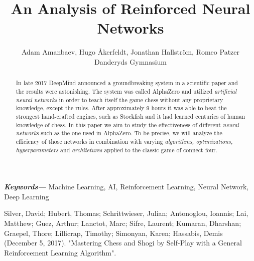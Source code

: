 \documentclass[a4paper]{article}
\title{An Analysis of Reinforced Neural Networks}
\author{Adam Amanbaev, Hugo Åkerfeldt, Jonathan Hallström, Romeo Patzer \\ 
        \small Danderyds Gymnasium \\
}
\providecommand{\keywords}[1]
{ 
    \small
    \textbf{\textit{Keywords---}} #1
}
\begin{document}
\maketitle

\begin{abstract}
    In late 2017 DeepMind announced a groundbreaking system in a scientific paper \cite{alphazero} and the results were astonishing. The system was called AlphaZero and utilized \emph{artificial neural networks} in order to teach itself the game chess without any proprietary knowledge, except the rules. After approximately 9 hours it was able to beat the strongest hand-crafted engines, such as Stockfish and it had learned centuries of human knowledge of chess. In this paper we aim to study the effectiveness of different \emph{neural networks} such as the one used in AlphaZero. To be precise, we will analyze the efficiency of those networks in combination with varying \emph{algorithms, optimizations, hyperparameters} and \emph {architetures} applied to the classic game of connect four. 
\end{abstract} \hspace{10pt}

\keywords{Machine Learning, AI, Reinforcement Learning, Neural Network, Deep Learning}

\begin{thebibliography}{100}
Silver, David; Hubert, Thomas; Schrittwieser, Julian; Antonoglou, Ioannis; Lai, Matthew; Guez, Arthur; Lanctot, Marc; Sifre, Laurent; Kumaran, Dharshan; Graepel, Thore; Lillicrap, Timothy; Simonyan, Karen; Hassabis, Demis (December 5, 2017). "Mastering Chess and Shogi by Self-Play with a General Reinforcement Learning Algorithm".

\end{thebibliography}
\end{document}
